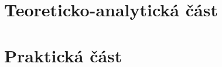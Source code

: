 \documentclass[11pt,a4paper]{report}
\let\openright=\clearpage
\begin{document}


\setcounter{tocdepth}{2}
\tableofcontents




\pagestyle{fancyx}

{%
\pagestyle{plain}

}

\part{Teoreticko-analytická část}





\part{Praktická část}




{%
\pagestyle{plain}

}


\end{document}
